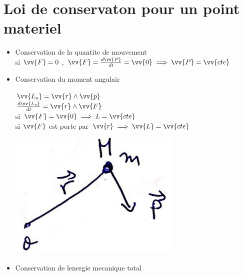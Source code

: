 \documentclass[12pt]{book}
\begin{document}
        \section{Loi de conservaton pour un point materiel}
            \begin{itemize}
                \item Conservation de la quantite de mouvement 
                    \\ si $\vv{F} = 0$ , $\vv{F}=\frac{d\vv{P}}{dt}=\vv{0} \implies \vv{P}=\vv{cte}$
                \item Conservation du moment angulair 
                    \begin{center}
                        \begin{minipage}{0.49\linewidth}
                            $\vv{L_o} = \vv{r}\wedge\vv{p}$\\
                            $\frac{d\vv{L_o}}{dt} = \vv{r}\wedge\vv{F}$\\
                            si $\vv{F} = \vv{0} \implies L = \vv{cte}$ \\
                            si $\vv{F}$ est porte par $\vv{r} \implies \vv{L} = \vv{cte}$
                        \end{minipage}
                        \begin{minipage}{0.39\linewidth}
                            \includegraphics[width = \linewidth]{pic/conservationmomentangulair.png}
                        \end{minipage}
                    \end{center}
                \item Conservation de lenergie mecanique total 

\end{itemize}
\end{document}
